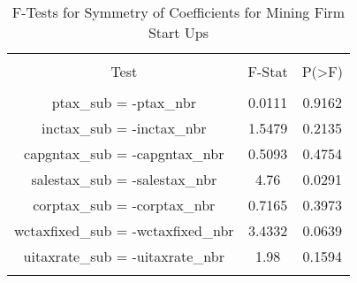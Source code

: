 
\begin{table}[!htbp] \centering 
  \caption{F-Tests for Symmetry of Coefficients for Mining Firm Start Ups} 
  \label{21Ftests} 
\begin{tabular}{@{\extracolsep{5pt}} ccc} 
\\[-1.8ex]\hline 
\hline \\[-1.8ex] 
Test & F-Stat & P(\textgreater F) \\ 
\hline \\[-1.8ex] 
ptax\_sub = -ptax\_nbr & 0.0111 & 0.9162 \\ 
inctax\_sub = -inctax\_nbr & 1.5479 & 0.2135 \\ 
capgntax\_sub = -capgntax\_nbr & 0.5093 & 0.4754 \\ 
salestax\_sub = -salestax\_nbr & 4.76 & 0.0291 \\ 
corptax\_sub = -corptax\_nbr & 0.7165 & 0.3973 \\ 
wctaxfixed\_sub = -wctaxfixed\_nbr & 3.4332 & 0.0639 \\ 
uitaxrate\_sub = -uitaxrate\_nbr & 1.98 & 0.1594 \\ 
\hline \\[-1.8ex] 
\end{tabular} 
\end{table} 
